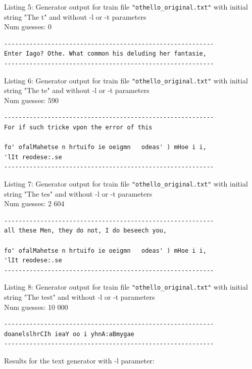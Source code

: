 \documentclass{article}
\begin{document}
Listing 5: Generator output for train file \verb|"othello_original.txt"| with initial string "The t" and without -l or -t parameters
\\Num guesses: 0

\begin{lstlisting}
----------------------------------------------------------
Enter Iago? Othe. What common his deluding her fantasie,
----------------------------------------------------------
\end{lstlisting}

Listing 6: Generator output for train file \verb|"othello_original.txt"| with initial string "The te" and without -l or -t parameters
\\Num guesses: 590

\begin{lstlisting}
----------------------------------------------------------
For if such tricke vpon the error of this

fo' ofalMahetse n hrtuifo ie oeigmn   odeas' ) mHoe i i, 
'lIt reodese:.se
----------------------------------------------------------
\end{lstlisting}

Listing 7: Generator output for train file \verb|"othello_original.txt"| with initial string "The tes" and without -l or -t parameters
\\Num guesses: 2 604

\begin{lstlisting}
----------------------------------------------------------
all these Men, they do not, I do beseech you,

fo' ofalMahetse n hrtuifo ie oeigmn   odeas' ) mHoe i i, 
'lIt reodese:.se
----------------------------------------------------------
\end{lstlisting}

Listing 8: Generator output for train file \verb|"othello_original.txt"| with initial string "The test" and without -l or -t parameters
\\Num guesses: 10 000

\begin{lstlisting}
----------------------------------------------------------
doanelslhrCIh ieaY oo i yhnA:aBmygae
----------------------------------------------------------
\end{lstlisting}



Results for the text generator with -l parameter:


\hfill
\end{document}
